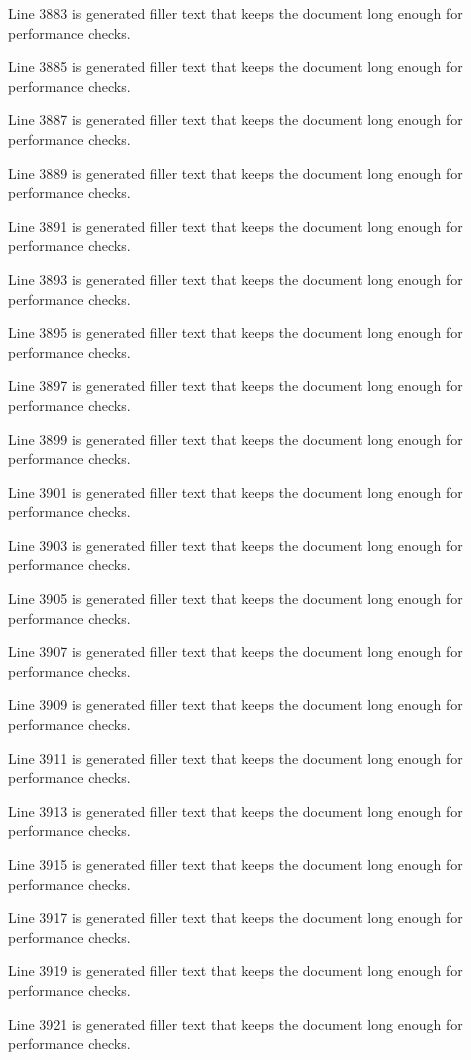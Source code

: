 Line 3883 is generated filler text that keeps the document long enough for performance checks.

Line 3885 is generated filler text that keeps the document long enough for performance checks.

Line 3887 is generated filler text that keeps the document long enough for performance checks.

Line 3889 is generated filler text that keeps the document long enough for performance checks.

Line 3891 is generated filler text that keeps the document long enough for performance checks.

Line 3893 is generated filler text that keeps the document long enough for performance checks.

Line 3895 is generated filler text that keeps the document long enough for performance checks.

Line 3897 is generated filler text that keeps the document long enough for performance checks.

Line 3899 is generated filler text that keeps the document long enough for performance checks.

Line 3901 is generated filler text that keeps the document long enough for performance checks.

Line 3903 is generated filler text that keeps the document long enough for performance checks.

Line 3905 is generated filler text that keeps the document long enough for performance checks.

Line 3907 is generated filler text that keeps the document long enough for performance checks.

Line 3909 is generated filler text that keeps the document long enough for performance checks.

Line 3911 is generated filler text that keeps the document long enough for performance checks.

Line 3913 is generated filler text that keeps the document long enough for performance checks.

Line 3915 is generated filler text that keeps the document long enough for performance checks.

Line 3917 is generated filler text that keeps the document long enough for performance checks.

Line 3919 is generated filler text that keeps the document long enough for performance checks.

Line 3921 is generated filler text that keeps the document long enough for performance checks.

